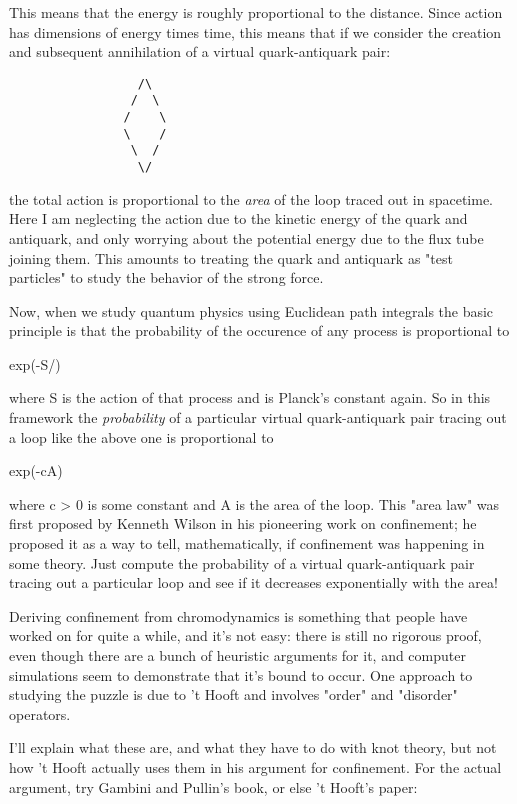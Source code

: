 This means that the energy is roughly proportional to the distance.
Since action has dimensions of energy times time, this means that if
we consider the creation and subsequent annihilation of
a virtual quark-antiquark pair: 

\begin{verbatim}
                  /\
                 /  \
                /    \
                \    /
                 \  /
                  \/

\end{verbatim}
    
the total action is proportional to the \emph{area} of the loop traced out
in spacetime.  Here I am neglecting the action due to the kinetic
energy of the quark and antiquark, and only worrying about the
potential energy due to the flux tube joining them.  This amounts to
treating the quark and antiquark as "test particles" to study the
behavior of the strong force.

Now, when we study quantum physics using Euclidean path integrals the
basic principle is that the probability of the occurence of any
process is proportional to

exp(-S/\hbar ) 

where S is the action of that process and \hbar  is Planck's constant
again.  So in this framework the \emph{probability} of a particular virtual 
quark-antiquark pair tracing out a loop like the above one is proportional
to 

exp(-cA)

where c > 0 is some constant and A is the area of the loop.  This
"area law" was first proposed by Kenneth Wilson in his pioneering work
on confinement; he proposed it as a way to tell, mathematically, if
confinement was happening in some theory.  Just compute the
probability of a virtual quark-antiquark pair tracing out a particular
loop and see if it decreases exponentially with the area!

Deriving confinement from chromodynamics is something that people have
worked on for quite a while, and it's not easy: there is still no
rigorous proof, even though there are a bunch of heuristic arguments
for it, and computer simulations seem to demonstrate that it's bound
to occur.  One approach to studying the puzzle is due to 't Hooft and
involves "order" and "disorder" operators.  

I'll explain what these are, and what they have to do with knot
theory, but not how 't Hooft actually uses them in his argument for
confinement.  For the actual argument, try Gambini and Pullin's book,
or else 't Hooft's paper:

